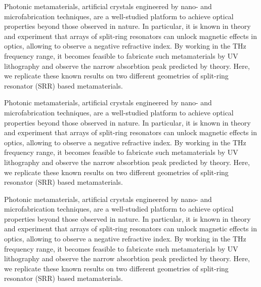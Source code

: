 \documentclass[aps,prb,twocolumn,groupedaddress]{revtex4-2}
\begin{document}
Photonic metamaterials, artificial crystals engineered by nano- and microfabrication techniques, are a well-studied platform to achieve optical properties beyond those observed in nature.
In particular, it is known in theory and experiment that arrays of split-ring resonators can unlock magnetic effects in optics, allowing to observe a negative refractive index\cite{lindenPhotonicMetamaterialsMagnetism2006a}.
By working in the THz frequency range, it becomes feasible to fabricate such metamaterials by UV lithography and observe the narrow absorbtion peak predicted by theory.
Here, we replicate these known results on two different geometries of split-ring resonator (SRR) based metamaterials.

Photonic metamaterials, artificial crystals engineered by nano- and microfabrication techniques, are a well-studied platform to achieve optical properties beyond those observed in nature.
In particular, it is known in theory and experiment that arrays of split-ring resonators can unlock magnetic effects in optics, allowing to observe a negative refractive index\cite{lindenPhotonicMetamaterialsMagnetism2006a}.
By working in the THz frequency range, it becomes feasible to fabricate such metamaterials by UV lithography and observe the narrow absorbtion peak predicted by theory.
Here, we replicate these known results on two different geometries of split-ring resonator (SRR) based metamaterials.

Photonic metamaterials, artificial crystals engineered by nano- and microfabrication techniques, are a well-studied platform to achieve optical properties beyond those observed in nature.
In particular, it is known in theory and experiment that arrays of split-ring resonators can unlock magnetic effects in optics, allowing to observe a negative refractive index\cite{lindenPhotonicMetamaterialsMagnetism2006a}.
By working in the THz frequency range, it becomes feasible to fabricate such metamaterials by UV lithography and observe the narrow absorbtion peak predicted by theory.
Here, we replicate these known results on two different geometries of split-ring resonator (SRR) based metamaterials. \\
\end{document}
